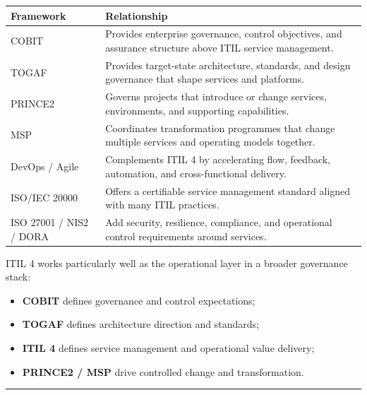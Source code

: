 \documentclass[
  letterpaper,
  DIV=11,
  numbers=noendperiod]{scrartcl}
\providecommand{\tightlist}{%
  \setlength{\itemsep}{0pt}\setlength{\parskip}{0pt}}
\begin{document}
\begin{longtable}[]{@{}
  >{\raggedright\arraybackslash}p{}
  >{\raggedright\arraybackslash}p{}@{}}
\toprule\noalign{}
\begin{minipage}[b]{\linewidth}\raggedright
Framework
\end{minipage} & \begin{minipage}[b]{\linewidth}\raggedright
Relationship
\end{minipage} \\
\midrule\noalign{}
\endhead
\bottomrule\noalign{}
\endlastfoot
COBIT & Provides enterprise governance, control objectives, and
assurance structure above ITIL service management. \\
TOGAF & Provides target-state architecture, standards, and design
governance that shape services and platforms. \\
PRINCE2 & Governs projects that introduce or change services,
environments, and supporting capabilities. \\
MSP & Coordinates transformation programmes that change multiple
services and operating models together. \\
DevOps / Agile & Complements ITIL 4 by accelerating flow, feedback,
automation, and cross-functional delivery. \\
ISO/IEC 20000 & Offers a certifiable service management standard aligned
with many ITIL practices. \\
ISO 27001 / NIS2 / DORA & Add security, resilience, compliance, and
operational control requirements around services. \\
\end{longtable}

ITIL 4 works particularly well as the operational layer in a broader
governance stack:

\begin{itemize}
\tightlist
\item
  \textbf{COBIT} defines governance and control expectations;
\item
  \textbf{TOGAF} defines architecture direction and standards;
\item
  \textbf{ITIL 4} defines service management and operational value
  delivery;
\item
  \textbf{PRINCE2 / MSP} drive controlled change and transformation.
\end{itemize}

\begin{center}\rule{0.5\linewidth}{0.5pt}\end{center}
\end{document}

